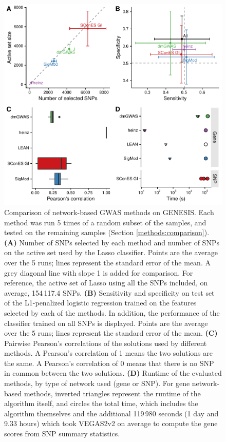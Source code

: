 \documentclass[twocolumn, 10pt]{article}
\begin{document}
\begin{figure}[htbp]
\centering
\includegraphics[width=.9\linewidth]{./figures/figure_4.pdf}
\caption{\label{fig:benchmark}
Comparison of network-based GWAS methods on GENESIS. Each method was run 5 times of a random subset of the samples, and tested on the remaining samples (Section \ref{methods:comparison}). \textbf{(A)} Number of SNPs selected by each method and number of SNPs on the active set used by the Lasso classifier. Points are the average over the 5 runs; lines represent the standard error of the mean. A grey diagonal line with slope 1 is added for comparison. For reference, the active set of Lasso using all the SNPs included, on average, 154\,117.4 SNPs. \textbf{(B)} Sensitivity and specificity on test set of the L1-penalized logistic regression trained on the features selected by each of the methods. In addition, the performance of the classifier trained on all SNPs is displayed. Points are the average over the 5 runs; lines represent the standard error of the mean. \textbf{(C)} Pairwise Pearson's correlations of the solutions used by different methods. A Pearson's correlation of 1 means the two solutions are the same. A Pearson's correlation of 0 means that there is no SNP in common between the two solutions. \textbf{(D)} Runtime of the evaluated methods, by type of network used (gene or SNP). For gene network-based methods, inverted triangles represent the runtime of the algorithm itself, and circles the total time, which includes the algorithm themselves and the additional 119\,980 seconds (1 day and 9.33 hours) which took VEGAS2v2 on average to compute the gene scores from SNP summary statistics.}
\end{figure}
\end{document}
